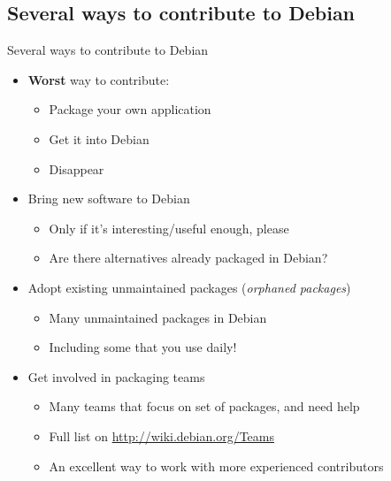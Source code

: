 \documentclass[10pt,final]{beamer}
\begin{document}
\subsection{Several ways to contribute to Debian}
\begin{frame}{Several ways to contribute to Debian}
  \begin{itemize}
  \item \textbf{Worst} way to contribute:
    \begin{itemize}
    \item Package your own application
    \item Get it into Debian
    \item Disappear
    \end{itemize}
    \br
  \item Bring new software to Debian
    \begin{itemize}
    \item Only if it's interesting/useful enough, please
    \item Are there alternatives already packaged in Debian?
    \end{itemize}
    \br
  \item Adopt existing unmaintained packages (\textsl{orphaned packages})
    \begin{itemize}
    \item Many unmaintained packages in Debian
    \item Including some that you use daily!
    \end{itemize}
    \br
  \item Get involved in packaging teams
    \begin{itemize}
    \item Many teams that focus on set of packages, and need help
    \item Full list on \url{http://wiki.debian.org/Teams}
    \item An excellent way to work with more experienced contributors
    \end{itemize}
  \end{itemize}
\end{frame}
\end{document}
